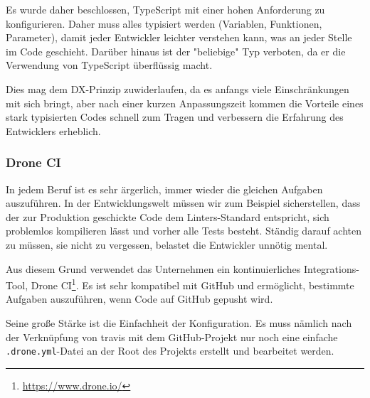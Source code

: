 Es wurde daher beschlossen, TypeScript mit einer hohen Anforderung zu konfigurieren.
Daher muss alles typisiert werden (Variablen, Funktionen, Parameter), damit jeder Entwickler leichter verstehen kann, was an jeder Stelle im Code geschieht.
Darüber hinaus ist der "beliebige" Typ verboten, da er die Verwendung von TypeScript überflüssig macht.

Dies mag dem DX-Prinzip zuwiderlaufen, da es anfangs viele Einschränkungen mit sich bringt, aber nach einer kurzen Anpassungszeit kommen die Vorteile eines stark typisierten Codes schnell zum Tragen und verbessern die Erfahrung des Entwicklers erheblich.

\subsubsection{Drone CI}

In jedem Beruf ist es sehr ärgerlich, immer wieder die gleichen Aufgaben auszuführen.
In der Entwicklungswelt müssen wir zum Beispiel sicherstellen, dass der zur Produktion geschickte Code dem Linters-Standard entspricht, sich problemlos kompilieren lässt und vorher alle Tests besteht.
Ständig darauf achten zu müssen, sie nicht zu vergessen, belastet die Entwickler unnötig mental.

Aus diesem Grund verwendet das Unternehmen ein kontinuierliches Integrations-Tool, Drone CI\footnote{\href{https://www.drone.io/}{https://www.drone.io/}}.
Es ist sehr kompatibel mit GitHub und ermöglicht, bestimmte Aufgaben auszuführen, wenn Code auf GitHub gepusht wird.

Seine große Stärke ist die Einfachheit der Konfiguration. Es muss nämlich nach der Verknüpfung von travis mit dem GitHub-Projekt nur noch eine einfache \lstinline!.drone.yml!-Datei an der Root des Projekts erstellt und bearbeitet werden.
